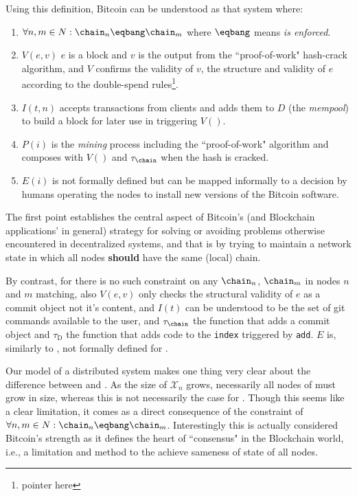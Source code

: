 \documentclass[twocolumn,showpacs,%
  nofootinbib,aps,superscriptaddress,%
  eqsecnum,prd,notitlepage,showkeys,10pt]{revtex4-1}
\begin{document}
Using this definition, Bitcoin can be understood as that system \sbtc where:
\begin{enumerate}
\item $\forall n,m \in N: \chain_n\eqbang\chain_m$ where $\eqbang$ means \textit{is enforced}.
\item $V(e,v)$ $e$ is a block and $v$ is the output from the ``proof-of-work" hash-crack algorithm, and $V$ confirms the validity of $v$, the structure and validity of $e$ according to the double-spend rules\footnote{pointer here}.
\item $I(t,n)$ accepts transactions from clients and adds them to $D$ (the \textit{mempool}) to build a block for later use in triggering $V()$.
\item $P(i)$ is the \textit{mining} process including the ``proof-of-work" algorithm and composes with $V()$ and $\tau_\chain$ when the hash is cracked.
\item $E(i)$ is not formally defined but can be mapped informally to a decision by humans operating the nodes to install new versions of the Bitcoin software.
\end{enumerate}

The first point establishes the central aspect of Bitcoin's (and Blockchain applications' in general) strategy for solving or avoiding problems otherwise encountered in decentralized systems, and that is by trying to maintain a network state in which all nodes \textbf{should} have the same (local) chain.

By contrast, for \sgit there is no such constraint on any $\chain_n$, $\chain_m$ in nodes $n$ and $m$ matching, also $V(e,v)$ only checks the structural validity of $e$ as a commit object not it's content, and $I(t)$ can be understood to be the set of git commands available to the user, and $\tau_\chain$ the function that adds a commit object and $\tau_\textrm{D}$ the function that adds code to the \texttt{index} triggered by \texttt{add}. $E$ is, similarly to \sbtc, not formally defined for \sgit. 

Our model of a distributed system makes one thing very clear about the difference between \sbtc and \sgit.  As the size of $\mathcal{X}_n$ grows, necessarily all nodes of \sbtc must grow in size, whereas this is not necessarily the case for \sgit.  Though this seems like a clear limitation, it comes as a direct consequence of the constraint of $\forall n,m \in N: \chain_n\eqbang\chain_m$. Interestingly this is actually considered Bitcoin's strength as it defines the heart of ``consensus" in the Blockchain world, i.e., a limitation and method to the achieve sameness of state of all nodes.
\end{document}

